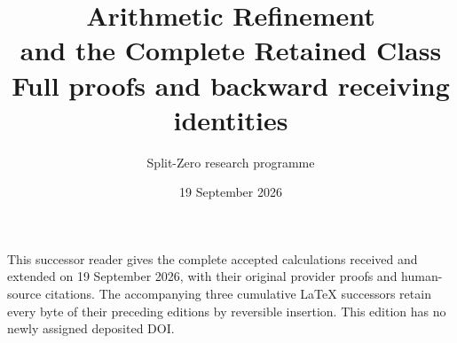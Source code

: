 \documentclass[11pt,a4paper]{article}
\title{Arithmetic Refinement\\and the Complete Retained Class\\[0.6em]\large Full proofs and backward receiving identities}
\author{Split-Zero research programme}
\date{19 September 2026}
\begin{document}
\maketitle
\noindent This successor reader gives the complete accepted calculations received and
extended on 19 September 2026, with their original provider proofs and
human-source citations. The accompanying three cumulative LaTeX successors
retain every byte of their preceding editions by reversible insertion.
This edition has no newly assigned deposited DOI.
\tableofcontents
\end{document}
